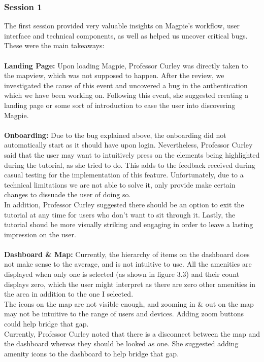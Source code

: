 \subsubsection{Session 1}
The first session provided very valuable insights on Magpie's workflow, user interface and technical components, as well as helped us uncover critical bugs. These were the main takeaways:\\ \\
\textbf{Landing Page: }
Upon loading Magpie, Professor Curley was directly taken to the mapview, which was not supposed to happen. After the review, we investigated the cause of this event and uncovered a bug in the authentication which we have been working on. Following this event, she suggested creating a landing page or some sort of introduction to ease the user into discovering Magpie.\\ \\
\textbf{Onboarding: }
Due to the bug explained above, the onboarding did not automatically start as it should have upon login. Nevertheless, Professor Curley said that the user may want to intuitively press on the elements being highlighted during the tutorial, as she tried to do. This adds to the feedback received during casual testing for the implementation of this feature. Unfortunately, due to a technical limitations we are not able to solve it, only provide make certain changes to dissuade the user of doing so.\\
In addition, Professor Curley suggested there should be an option to exit the tutorial at any time for users who don't want to sit through it. Lastly, the tutorial shoud be more visually striking and engaging in order to leave a lasting impression on the user.\\ \\
\textbf{Dashboard \& Map: }
Currently, the hierarchy of items on the dashboard does not make sense to the average, and is not intuitive to use. All the amenities are displayed when only one is selected (as shown in figure 3.3) and their count displays zero, which the user might interpret as there are zero other amenities in the area in addition to the one I selected.\\
The icons on the map are not visible enough, and zooming in \& out on the map may not be intuitive to the range of users and devices. Adding zoom buttons could help bridge that gap. \\
Currently, Professor Curley noted that there is a disconnect between the map and the dashboard whereas they should be looked as one. She suggested adding amenity icons to the dashboard to help bridge that gap.\\
